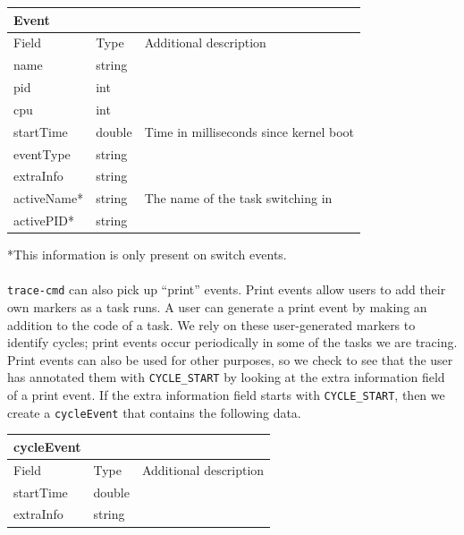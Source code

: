 \documentclass{hmcclinic}
\begin{document}
  \begin{center}
    \begin{tabular}{lll}
      \toprule
      Event      &        &                                        \\
      \midrule
      Field     & Type   & Additional description                 \\
      \midrule
      name      & string &                                        \\
      pid       & int    &                                        \\
      cpu       & int    &                                        \\
      startTime & double & Time in milliseconds since kernel boot \\
      eventType & string &                                        \\
      extraInfo & string &                                        \\
      activeName* & string & The name of the task switching in      \\
      activePID*  & string &                                        \\
      \bottomrule
    \end{tabular}
  \end{center}

  *This information is only present on switch events.\\\\

  \texttt{trace-cmd} can also pick up ``print'' events. Print events allow users to add
  their own markers as a task runs. A user can generate a print event by making
  an addition to the code of a task. We rely on these user-generated markers to
  identify cycles; print events occur periodically in some of the tasks we are
  tracing. Print events can also be used for other purposes, so we check to see
  that the user has annotated them with \texttt{CYCLE\_START} by looking at the extra
  information field of a print event. If the extra information field starts with
  \texttt{CYCLE\_START}, then we create a \texttt{cycleEvent} that contains the following data.

  \begin{center}
    \begin{tabular}{lll}
      \toprule
      cycleEvent      &        &                                        \\
      \midrule
      Field     & Type   & Additional description                 \\
      \midrule
      startTime      & double &                                        \\
      extraInfo       & string    &                                        \\
      \bottomrule
    \end{tabular}
  \end{center}
\end{document}
